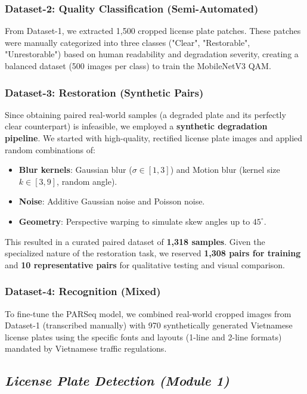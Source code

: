 \documentclass[a4paper,11pt,twocolumn]{article}
\begin{document}
	\subsubsection{Dataset-2: Quality Classification (Semi-Automated)}
	From Dataset-1, we extracted 1,500 cropped license plate patches. These patches were manually categorized into three classes ("Clear", "Restorable", "Unrestorable") based on human readability and degradation severity, creating a balanced dataset (500 images per class) to train the MobileNetV3 QAM.
	
	\subsubsection{Dataset-3: Restoration (Synthetic Pairs)}
	Since obtaining paired real-world samples (a degraded plate and its perfectly clear counterpart) is infeasible, we employed a \textbf{synthetic degradation pipeline}. We started with high-quality, rectified license plate images and applied random combinations of:
	\begin{itemize}
		\item \textbf{Blur kernels}: Gaussian blur ($\sigma \in [1, 3]$) and Motion blur (kernel size $k \in [3, 9]$, random angle).
		\item \textbf{Noise}: Additive Gaussian noise and Poisson noise.
		\item \textbf{Geometry}: Perspective warping to simulate skew angles up to $45^\circ$.
	\end{itemize}
	This resulted in a curated paired dataset of \textbf{1,318 samples}. Given the specialized nature of the restoration task, we reserved \textbf{1,308 pairs for training} and \textbf{10 representative pairs} for qualitative testing and visual comparison.
	
	\subsubsection{Dataset-4: Recognition (Mixed)}
	To fine-tune the PARSeq model, we combined real-world cropped images from Dataset-1 (transcribed manually) with 970 synthetically generated Vietnamese license plates using the specific fonts and layouts (1-line and 2-line formats) mandated by Vietnamese traffic regulations.
	
	\subsection{\textit{License Plate Detection (Module 1)}}
	
\end{document}
